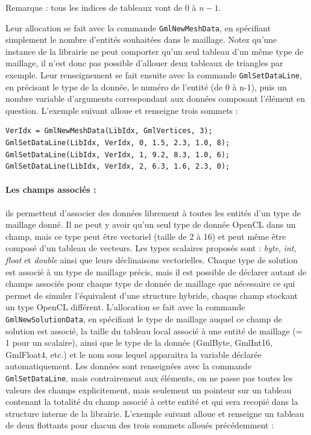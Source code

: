 \documentclass[a4paper,12pt]{article}
\begin{document}
Remarque : tous les indices de tableaux vont de $0$ à $n-1$.

Leur allocation se fait avec la commande {\tt GmlNewMeshData}, en spécifiant simplement le nombre d'entités souhaitées dans le maillage.
Notez qu'une instance de la librairie ne peut comporter qu'un seul tableau d'un même type de maillage, il n'est donc pas possible d'allouer deux tableaux de triangles par exemple.
Leur renseignement se fait ensuite avec la commande {\tt GmlSetDataLine}, en précisant le type de la donnée, le numéro de l'entité (de 0 à n-1), puis un nombre variable d'arguments correspondant aux données composant l'élément en question.
L'exemple suivant alloue et renseigne trois sommets :

\begin{tt}
\begin{verbatim}
VerIdx = GmlNewMeshData(LibIdx, GmlVertices, 3);
GmlSetDataLine(LibIdx, VerIdx, 0, 1.5, 2.3, 1.0, 8);
GmlSetDataLine(LibIdx, VerIdx, 1, 9.2, 8.3, 1.0, 6);
GmlSetDataLine(LibIdx, VerIdx, 2, 6.3, 1.6, 2.3, 0);
\end{verbatim}
\end{tt}
\normalfont

\paragraph{Les champs associés : } ils permettent d'associer des données librement à toutes les entités d'un type de maillage donné.
Il ne peut y avoir qu'un seul type de donnée OpenCL dans un champ, mais ce type peut être vectoriel (taille de 2 à 16) et peut même être composé d'un tableau de vecteurs.
Les types scalaires proposés sont : \emph{byte}, \emph{int}, \emph{float} et \emph{double} ainsi que leurs déclinaisons vectorielles.
Chaque type de solution est associé à un type de maillage précis, mais il est possible de déclarer autant de champs associés pour chaque type de donnée de maillage que nécessaire ce qui permet de simuler l’équivalent d'une structure hybride, chaque champ stockant un type OpenCL différent.
L'allocation se fait avec la commande {\tt GmlNewSolutionData}, en spécifiant le type de maillage auquel ce champ de solution est associé, la taille du tableau local associé à une entité de maillage (= 1 pour un scalaire), ainsi que le type de la donnée (GmlByte, GmlInt16, GmlFloat4, etc.) et le nom sous lequel apparaitra la variable déclarée automatiquement.
Les données sont renseignées avec la commande {\tt GmlSetDataLine}, mais contrairement aux éléments, on ne passe pas toutes les valeurs des champs explicitement, mais seulement un pointeur sur un tableau contenant la totalité du champ associé à cette entité et qui sera recopié dans la structure interne de la librairie.
L'exemple suivant alloue et renseigne un tableau de deux flottants pour chacun des trois sommets alloués précédemment :
\end{document}
